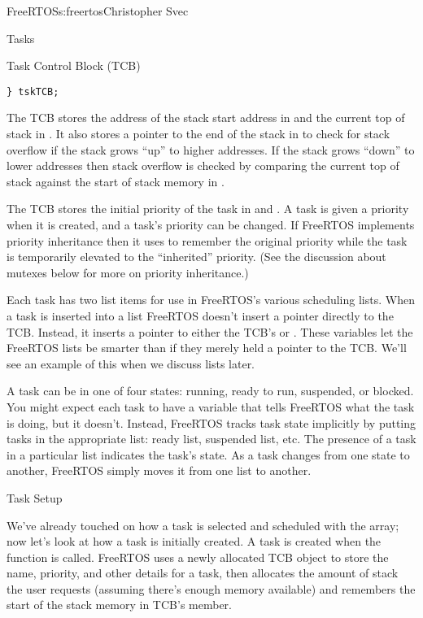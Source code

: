 \begin{aosachapter}{FreeRTOS}{s:freertos}{Christopher Svec}
\begin{aosasect1}{Tasks}
\begin{aosasect2}{Task Control Block (TCB)}
\begin{verbatim}
} tskTCB;
\end{verbatim}

The TCB stores the address of the stack start address in
 and the current top of stack in . It
also stores a pointer to the end of the stack in 
to check for stack overflow if the stack grows ``up'' to higher
addresses. If the stack grows ``down'' to lower addresses then stack
overflow is checked by comparing the current top of stack against the
start of stack memory in .

The TCB stores the initial priority of the task in 
and . A task is given a priority when it is
created, and a task's priority can be changed.  If FreeRTOS
implements priority inheritance then it uses  to
remember the original priority while the task is temporarily elevated
to the ``inherited'' priority. (See the discussion about mutexes below
for more on priority inheritance.)

Each task has two list items for use in FreeRTOS's various scheduling
lists. When a task is inserted into a list FreeRTOS doesn't insert a
pointer directly to the TCB.  Instead, it inserts a pointer to either
the TCB's  or . These
 variables let the FreeRTOS lists be smarter than if
they merely held a pointer to the TCB. We'll see an example of this
when we discuss lists later.

A task can be in one of four states: running, ready to run, suspended,
or blocked.  You might expect each task to have a variable that tells
FreeRTOS what the task is doing, but it doesn't. Instead, FreeRTOS tracks
task state implicitly by putting tasks in the appropriate list: ready
list, suspended list, etc. The presence of a task in a particular list
indicates the task's state.  As a task changes from one state to another, 
FreeRTOS simply moves it
from one list to another.

\end{aosasect2}

\begin{aosasect2}{Task Setup}


We've already touched on how a task is selected and scheduled with the
 array; now let's look at how a task is
initially created.  A task is created when the 
function is called.  FreeRTOS uses a newly allocated TCB object to
store the name, priority, and other details for a task, then allocates
the amount of stack the user requests (assuming there's enough memory
available) and remembers the start of the stack memory in TCB's
 member.


\end{aosasect2}
\end{aosasect1}
\end{aosachapter}
